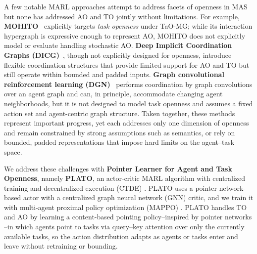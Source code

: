 

A few notable MARL approaches attempt to address facets of openness in MAS but none has addressed AO and TO jointly without limitations.  For example, \textbf{MOHITO}~\cite{anilmohito} explicitly targets \textit{task openness} under TaO-MG; while its interaction hypergraph is expressive enough to represent AO, MOHITO does not explicitly model or evaluate handling stochastic AO. \textbf{Deep Implicit Coordination Graphs (DICG)}~\cite{dicg}, though not explicitly designed for openness, introduce flexible coordination structures that provide limited support for AO and TO but still operate within bounded and padded inputs. \textbf{Graph convolutional reinforcement learning (DGN)}~\cite{dgn} performs coordination by graph convolutions over an agent graph and can, in principle, accommodate changing agent neighborhoods, but it is not designed to model task openness and assumes a fixed action set and agent-centric graph structure.  
Taken together, these methods represent important progress, yet each addresses only one dimension of openness and remain constrained by strong assumptions such as semantics, or rely on bounded, padded representations that impose hard limits on the agent–task space. 



We address these challenges with \textbf{Pointer Learner for Agent and Task Openness}, namely \textbf{PLATO}, an actor-critic MARL algorithm with centralized training and decentralized execution (CTDE) \cite{lowe2017multi}. PLATO uses a pointer network-based \cite{ptr} actor with a centralized graph neural network (GNN) \cite{gnn} critic, and we train it with multi-agent proximal policy optimization (MAPPO) \cite{mappo}.
PLATO handles TO and AO by learning a content-based pointing policy--inspired by pointer networks \cite{ptr}--in which agents point to tasks via query–key attention over only the currently available tasks, so the action distribution adapts as agents or tasks enter and leave without retraining or bounding.


